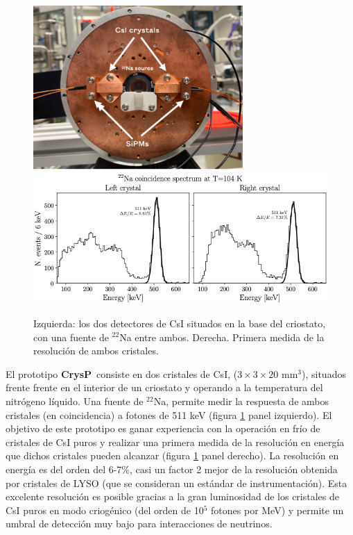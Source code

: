 \documentclass[12pt,a4paper,article]{report} %
\def\crysp{{\bf CrysP}}
\begin{document}
\begin{figure}[bht!]
\begin{center}
\includegraphics[width=8cm]{img/cryo0.png}
\includegraphics[width=12cm]{img/eres.png}
\caption{Izquierda: los dos detectores de CsI situados en la base del criostato, con una fuente de ${}^{22}$Na entre ambos. Derecha. Primera medida de la resolución de ambos cristales.}
\label{fig:crysp}
\end{center}
\end{figure}


El prototipo \crysp\ consiste en dos cristales de CsI, ($3\times 3 \times 20$ mm$^3$), situados frente frente en el interior de un criostato y operando a la temperatura del nitrógeno líquido. Una fuente de ${}^{22}$Na, permite medir la respuesta de ambos cristales (en coincidencia) a fotones de 511 keV (figura \ref{fig:crysp} panel izquierdo). El objetivo de este prototipo es ganar experiencia con la operación en frío de cristales de 
CsI puros y realizar una primera medida de la resolución en energía que dichos cristales pueden alcanzar (figura \ref{fig:crysp} panel derecho). La resolución en energía es del orden del 6-7\%, casi un factor 2 mejor de la resolución obtenida por cristales de LYSO (que se consideran un estándar de instrumentación). Esta excelente resolución es posible gracias a la gran luminosidad de los cristales de CsI puros en modo criogénico (del orden de 10$^5$ fotones por MeV) y permite un umbral de detección muy bajo para interacciones de neutrinos. 
\end{document}
